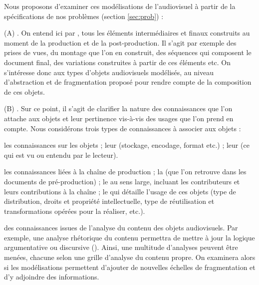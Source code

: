 Nous proposons d'examiner ces modélisations de l'audiovisuel à partir de la spécifications de nos problèmes (section \ref{sec:prob}) : 
\begin{liste}
	\item[(A)] .
	On entend ici par , tous les éléments intermédiaires et finaux construits au moment de la production et de la post-production.
	Il s'agit par exemple des prises de vues, du montage que l'on en construit, des séquences qui composent le document final, des variations construites à partir de ces éléments etc. 
	On s'intéresse donc aux types d'objets audiovisuels modélisés, au niveau d'abstraction et de fragmentation proposé pour rendre compte de la composition de ces objets.\\

	\item[(B)] .
	Sur ce point, il s'agit de clarifier la nature des connaissances que l'on attache aux objets et leur pertinence vis-à-vis des usages que l'on prend en compte. 
	Nous considérons trois types de connaissances à associer aux objets : 
	\begin{liste}
		\item les connaissances sur les objets ; leur  (stockage, encodage, format etc.) ; leur  (ce qui est vu ou entendu par le lecteur).

		\item les connaissances liées à la chaîne de production ; la  (que l'on retrouve dans les documents de pré-production) ; le  au sens large, incluant les contributeurs et leurs contributions à la chaîne ; le   qui détaille l'usage de ces objets (type de distribution, droits et propriété intellectuelle, type de réutilisation et transformations opérées pour la réaliser, etc.).

		\item des connaissances issues de l'analyse du contenu des objets audiovisuels. 
		Par exemple, une analyse rhétorique du contenu permettra de mettre à jour la logique argumentative ou discursive (\cite{Gaillard2008}). 
		Ainsi, une multitude d'analyses peuvent être menées, chacune selon une grille d'analyse du contenu propre. 
		On examinera alors si les modélisations permettent d'ajouter de nouvelles échelles de fragmentation et d'y adjoindre des informations.
	\end{liste}
\end{liste}

